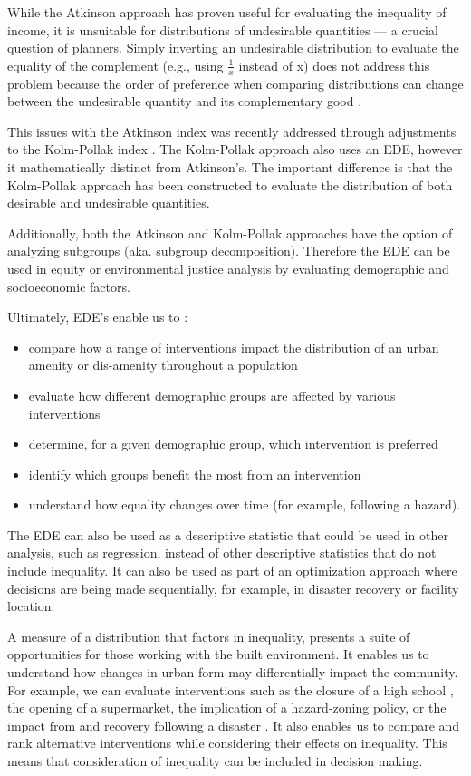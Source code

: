 \documentclass[final,3p,times,onecolumn,sort&compress]{elsarticle}
\begin{document}
While the Atkinson approach has proven useful for evaluating the inequality of income, it is unsuitable for distributions of undesirable quantities \citep{Cox2012-lg, Sheriff2020-ge, Maguire2011-fi, Fann2011-hd} --- a crucial question of planners.
Simply inverting an undesirable distribution to evaluate the equality of the complement (e.g., using $\frac{1}{x}$ instead of x) does not address this problem because the order of preference when comparing distributions can change between the undesirable quantity and its complementary good \citep{Sheriff2020-ge, Cox2012-lg}.

This issues with the Atkinson index was recently addressed through adjustments to the Kolm-Pollak index \citep{Sheriff2020-ge}.
The Kolm-Pollak approach also uses an EDE, however it mathematically distinct from Atkinson's.
The important difference is that the Kolm-Pollak approach has been constructed to evaluate the distribution of both desirable and undesirable quantities. 

Additionally, both the Atkinson and Kolm-Pollak approaches have the option of analyzing subgroups (aka. subgroup decomposition).
Therefore the EDE can be used in equity or environmental justice analysis by evaluating demographic and socioeconomic factors.

Ultimately, EDE's enable us to \citep{Sheriff2020-ge}: 
\begin{itemize}
    \item compare how a range of interventions impact the distribution of an urban amenity or dis-amenity throughout a population
    \item evaluate how different demographic groups are affected by various interventions
    \item determine, for a given demographic group, which intervention is preferred
    \item identify which groups benefit the most from an intervention
    \item understand how equality changes over time (for example, following a hazard).
\end{itemize}
The EDE can also be used as a descriptive statistic that could be used in other analysis, such as regression, instead of other descriptive statistics that do not include inequality.
It can also be used as part of an optimization approach where decisions are being made sequentially, for example, in disaster recovery or facility location.

A measure of a distribution that factors in inequality, presents a suite of opportunities for those working with the built environment.
It enables us to understand how changes in urban form may differentially impact the community.
For example, we can evaluate interventions such as the closure of a high school \citep{Pacione1989-ui}, the opening of a supermarket, the implication of a hazard-zoning policy, or the impact from and recovery following a disaster \citep{Logan2020-vj}.
It also enables us to compare and rank alternative interventions while considering their effects on inequality.
This means that consideration of inequality can be included in decision making.
\end{document}
